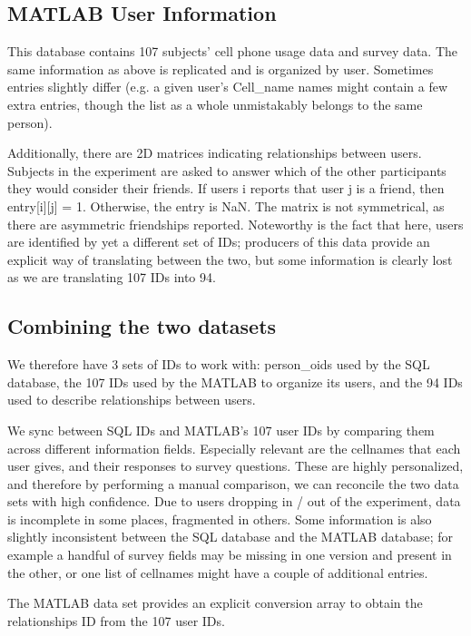\documentclass[pageno]{jpaper}
\begin{document}
\subsection{MATLAB User Information}

This database contains 107 subjects' cell phone usage data and survey data. The same information as above is replicated and is organized by user. Sometimes entries slightly differ (e.g. a given user's Cell\_name names might contain a few extra entries, though the list as a whole unmistakably belongs to the same person).

Additionally, there are 2D matrices indicating relationships between users. Subjects in the experiment are asked to answer which of the other participants they would consider their friends. If users i reports that user j is a friend, then entry[i][j] = 1. Otherwise, the entry is NaN. The matrix is not symmetrical, as there are asymmetric friendships reported. Noteworthy is the fact that here, users are identified by yet a different set of IDs; producers of this data provide an explicit way of translating between the two, but some information is clearly lost as we are translating 107 IDs into 94.

\subsection{Combining the two datasets}

We therefore have 3 sets of IDs to work with: person\_oids used by the SQL database, the 107 IDs used by the MATLAB to organize its users, and the 94 IDs used to describe relationships between users. 

We sync between SQL IDs and MATLAB's 107 user IDs by comparing them across different information fields. Especially relevant are the cellnames that each user gives, and their responses to survey questions. These are highly personalized, and therefore by performing a manual comparison, we can reconcile the two data sets with high confidence. Due to users dropping in / out of the experiment, data is incomplete in some places, fragmented in others. Some information is also slightly inconsistent between the SQL database and the MATLAB database; for example a handful of survey fields may be missing in one version and present in the other, or one list of cellnames might have a couple of additional entries. 

The MATLAB data set provides an explicit conversion array to obtain the relationships ID from the 107 user IDs.
\end{document}
